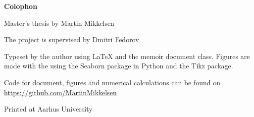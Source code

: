 \makeatletter
\edef\fontandleading{\@memptsize.0/\the\baselineskip}
\makeatother
\thispagestyle{empty}
\strut\vfill
{
	\setlength{\parindent}{0pt}
	\addtolength{\parskip}{.6em}
	
	\begin{center}
		\bfseries\sffamily Colophon
	\end{center}
	
	\small
	
	\textsl{\projecttitle}
	
	\smallskip
	
	Master's thesis by Martin Mikkelsen
	
	The project is supervised by Dmitri Fedorov
	
	Typeset by the author using \LaTeX{} and the \textsf{memoir} document class. Figures are made with the using the Seaborn package in Python and the Tikz package.
	
	Code for document, figures and numerical calculations can be found on \url{https://github.com/MartinMikkelsen}
	
	Printed at Aarhus University
}
\newpage